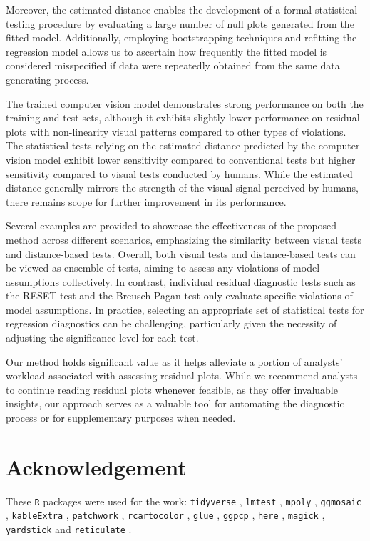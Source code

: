 \documentclass[]{interact}
\theoremstyle{plain}%
\theoremstyle{definition}
\theoremstyle{remark}
\begin{document}
Moreover, the estimated distance enables the development of a formal
statistical testing procedure by evaluating a large number of null plots
generated from the fitted model. Additionally, employing bootstrapping
techniques and refitting the regression model allows us to ascertain how
frequently the fitted model is considered misspecified if data were
repeatedly obtained from the same data generating process.

The trained computer vision model demonstrates strong performance on
both the training and test sets, although it exhibits slightly lower
performance on residual plots with non-linearity visual patterns
compared to other types of violations. The statistical tests relying on
the estimated distance predicted by the computer vision model exhibit
lower sensitivity compared to conventional tests but higher sensitivity
compared to visual tests conducted by humans. While the estimated
distance generally mirrors the strength of the visual signal perceived
by humans, there remains scope for further improvement in its
performance.

Several examples are provided to showcase the effectiveness of the
proposed method across different scenarios, emphasizing the similarity
between visual tests and distance-based tests. Overall, both visual
tests and distance-based tests can be viewed as ensemble of tests,
aiming to assess any violations of model assumptions collectively. In
contrast, individual residual diagnostic tests such as the RESET test
and the Breusch-Pagan test only evaluate specific violations of model
assumptions. In practice, selecting an appropriate set of statistical
tests for regression diagnostics can be challenging, particularly given
the necessity of adjusting the significance level for each test.

Our method holds significant value as it helps alleviate a portion of
analysts' workload associated with assessing residual plots. While we
recommend analysts to continue reading residual plots whenever feasible,
as they offer invaluable insights, our approach serves as a valuable
tool for automating the diagnostic process or for supplementary purposes
when needed.

\section*{Acknowledgement}\label{acknowledgement}

These \texttt{R} packages were used for the work: \texttt{tidyverse}
\citep{tidyverse}, \texttt{lmtest} \citep{lmtest}, \texttt{mpoly}
\citep{mpoly}, \texttt{ggmosaic} \citep{ggmosaic}, \texttt{kableExtra}
\citep{kableextra}, \texttt{patchwork} \citep{patchwork},
\texttt{rcartocolor} \citep{rcartocolor}, \texttt{glue} \citep{glue},
\texttt{ggpcp} \citep{ggpcp}, \texttt{here} \citep{here},
\texttt{magick} \citep{magick}, \texttt{yardstick} \citep{yardstick} and
\texttt{reticulate} \citep{reticulate}.
\end{document}
